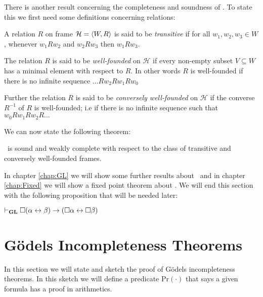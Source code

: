 \documentclass[../main.tex]{subfiles}
\begin{document}
There is another result concerning the completeness and soundness of \GL. To
state this we first need some definitions concerning relations:
\begin{defi}
	A relation $R$ on frame $\mathcal{H}=\langle W,R\rangle$ is said to be
	\textit{transitive} if for all $w_1,w_2,w_3\in W$, whenever $w_1Rw_2$
	and $w_2Rw_3$ then $w_1Rw_3$.
	
	The relation $R$ is said to be \textit{well-founded} on
	$\mathcal{H}$ if every non-empty  subset $V\subseteq W$ has a minimal
	element with respect to $R$. In other words $R$ is well-founded if
	there is no infinite sequence $\ldots Rw_2Rw_1Rw_0$

	Further the relation $R$ is said to be \textit{conversely well-founded}
	on $\mathcal{H}$ if the converse $R^{-1}$ of $R$ is well-founded; i.e
	if there is no infinite sequence such that $w_0Rw_1Rw_2R\ldots$
\end{defi}
We can now state the following theorem:
\begin{thm}
	\label{thm:GLcomplete}
	\GL\ is sound and weakly complete with respect to the class of
	transitive and conversely well-founded frames.
\end{thm}
In chapter \ref{chap:GL} we will show some further results about \GL\ and in
chapter
\ref{chap:Fixed} we will show a fixed point theorem about \GL.
We will end this section with the following proposition that will be needed
later:
\begin{prop}\label{prop:GL}
	$\vdash_{\text{\textbf{GL}}}\Box(\alpha\leftrightarrow\beta)\rightarrow(\Box\alpha\leftrightarrow\Box\beta)$
\end{prop}

\section{Gödels Incompleteness Theorems}
In this section we will state and sketch the proof of Gödels incompleteness
theorems. In this sketch we will define a predicate $\text{Pr}(\cdot)$ that
says a given formula has a proof in arithmetics.
\end{document}
